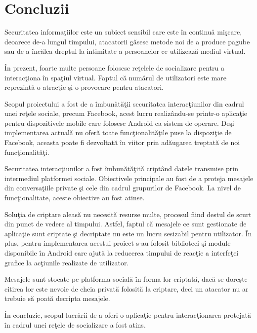 \chapter{Concluzii}

Securitatea informa\c{t}iilor este un subiect sensibil care este \^{i}n continu\u{a} mi\c{s}care, deoarece de-a lungul timpului, atacatorii g\u{a}sesc metode noi de a produce pagube sau de a \^{i}nc\u{a}lca dreptul la intimitate a persoanelor ce utilizeaz\u{a} mediul virtual.

\^{I}n prezent, foarte multe persoane folosesc re\c{t}elele de socializare pentru a interac\c{t}iona \^{i}n spa\c{t}iul virtual. Faptul c\u{a} num\u{a}rul de utilizatori este mare reprezint\u{a} o atrac\c{t}ie \c{s}i o provocare pentru atacatori.

Scopul proiectului a fost de a \^{i}mbun\u{a}t\u{a}\c{t}ii securitatea interac\c{t}iunilor din cadrul unei re\c{t}ele sociale, precum Facebook, acest lucru realiz\^{a}ndu-se printr-o aplica\c{t}ie pentru dispozitivele mobile care folosesc Android ca sistem de operare. De\c{s}i implementarea actual\u{a} nu ofer\u{a} toate func\c{t}ionalit\u{a}\c{t}ile puse la dispozi\c{t}ie de Facebook, aceasta poate fi dezvoltat\u{a} \^{i}n viitor prin ad\u{a}ugarea treptat\u{a} de noi func\c{t}ionalit\u{a}\c{t}i.

Securitatea interac\c{t}iunilor a fost \^{i}mbun\u{a}t\u{a}\c{t}it\u{a} cript\^{a}nd datele transmise prin intermediul platformei sociale. Obiectivele principale au fost de a proteja mesajele din conversa\c{t}iile private \c{s}i cele din cadrul grupurilor de Facebook. La nivel de func\c{t}ionalitate, aceste obiective au fost atinse.

Solu\c{t}ia de criptare aleas\u{a} nu necesit\u{a} resurse multe, procesul fiind destul de scurt din punct de vedere al timpului. Astfel, faptul c\u{a} mesajele ce sunt gestionate de aplica\c{t}ie sunt criptate \c{s}i decriptate nu este un lucru sesizabil pentru utilizator. \^{I}n plus, pentru implementarea acestui proiect s-au folosit biblioteci \c{s}i module disponibile \^{i}n Android care ajut\u{a} la reducerea timpului de reac\c{t}ie a interfe\c{t}ei grafice la ac\c{t}iunile realizate de utilizator.

Mesajele sunt stocate pe platforma social\u{a} \^{i}n forma lor criptat\u{a}, dac\u{a} se dore\c{s}te citirea lor este nevoie de cheia privat\u{a} folosit\u{a} la criptare, deci un atacator nu ar trebuie s\u{a} poat\u{a} decripta mesajele.

\^{I}n concluzie, scopul lucr\u{a}rii de a oferi o aplica\c{t}ie pentru interac\c{t}ionarea protejat\u{a} \^{i}n cadrul unei re\c{t}ele de socializare a fost atins. 

